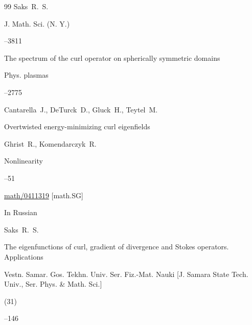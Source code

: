 \begin{thebibliography}{99}
\by Saks~R.~S.

\jour J. Math. Sci. (N. Y.)




--3811







\paper The spectrum of the curl operator on spherically symmetric domains

\jour Phys. plasmas




--2775

\by Cantarella~J., DeTurck~D., Gluck~H., Teytel~M. 





\paper Overtwisted energy-minimizing curl eigenfields

\by Ghrist~R., Komendarczyk~R.

\jour Nonlinearity 




--51


\arxiv \href{http://arxiv.org/abs/math/0411319}{math/0411319} [math.SG]




\lang In Russian

\by Saks~R.~S.

\paper The eigenfunctions of curl, gradient of divergence and Stokes operators. Applications

\jour Vestn. Samar. Gos. Tekhn. Univ. Ser. Fiz.-Mat. Nauki \rm [J. Samara State Tech. Univ., Ser. Phys. \& Math. Sci.]


(31)

--146





\end{thebibliography}
